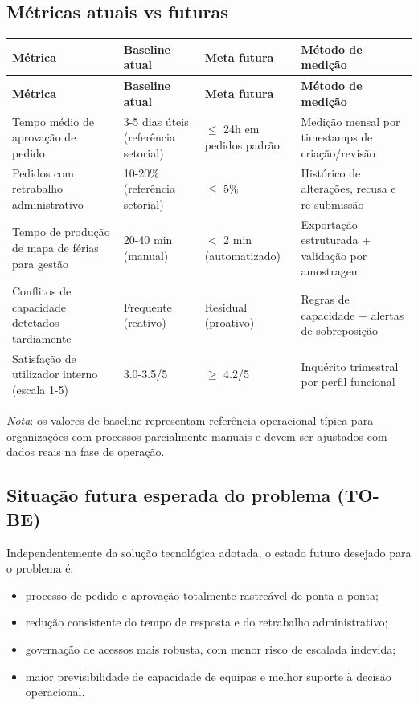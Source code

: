 \documentclass[11pt,a4paper]{article}
\begin{document}
\subsection{Métricas atuais vs futuras}
\begin{longtable}{p{4.2cm} p{3.0cm} p{3.0cm} p{4.8cm}}
\toprule
\textbf{Métrica} & \textbf{Baseline atual} & \textbf{Meta futura} & \textbf{Método de medição} \\
\midrule
\endfirsthead
\toprule
\textbf{Métrica} & \textbf{Baseline atual} & \textbf{Meta futura} & \textbf{Método de medição} \\
\midrule
\endhead
Tempo médio de aprovação de pedido & 3-5 dias úteis (referência setorial) & $\leq$ 24h em pedidos padrão & Medição mensal por timestamps de criação/revisão \\
Pedidos com retrabalho administrativo & 10-20\% (referência setorial) & $\leq$ 5\% & Histórico de alterações, recusa e re-submissão \\
Tempo de produção de mapa de férias para gestão & 20-40 min (manual) & $<$ 2 min (automatizado) & Exportação estruturada + validação por amostragem \\
Conflitos de capacidade detetados tardiamente & Frequente (reativo) & Residual (proativo) & Regras de capacidade + alertas de sobreposição \\
Satisfação de utilizador interno (escala 1-5) & 3.0-3.5/5 & $\geq$ 4.2/5 & Inquérito trimestral por perfil funcional \\
\bottomrule
\end{longtable}

\noindent\textit{Nota}: os valores de baseline representam referência operacional típica para organizações com processos parcialmente manuais e devem ser ajustados com dados reais na fase de operação.

\subsection{Situação futura esperada do problema (TO-BE)}
Independentemente da solução tecnológica adotada, o estado futuro desejado para o problema é:

\begin{itemize}
  \item processo de pedido e aprovação totalmente rastreável de ponta a ponta;
  \item redução consistente do tempo de resposta e do retrabalho administrativo;
  \item governação de acessos mais robusta, com menor risco de escalada indevida;
  \item maior previsibilidade de capacidade de equipas e melhor suporte à decisão operacional.
\end{itemize}
\end{document}
